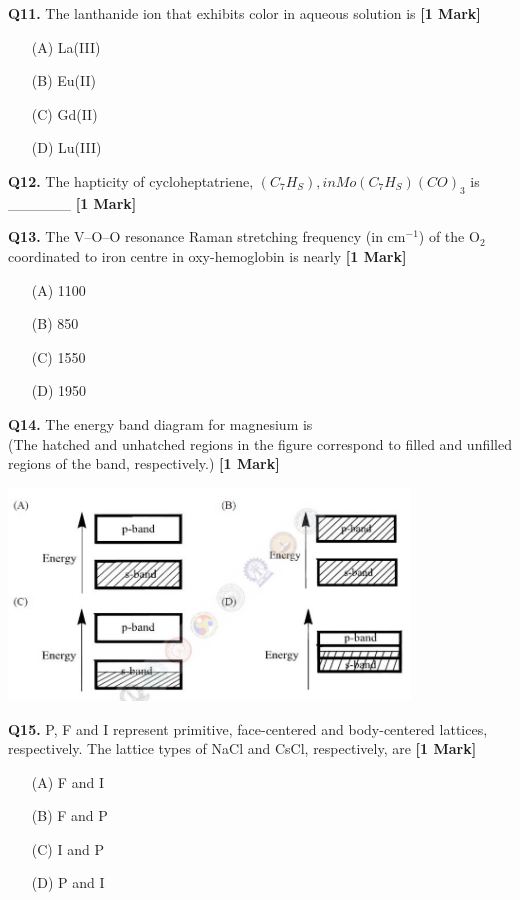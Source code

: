 \documentclass[11pt]{article}
\newcommand{\questiona}[2]{
    \noindent\textbf{Q#2.} #1 \hfill \textbf{[1 Mark]}
}
\begin{document}
\questiona{The lanthanide ion that exhibits color in aqueous solution is}{11}
\begin{enumerate}
    \item[(A)] La(III)
    \item[(B)] Eu(II)
    \item[(C)] Gd(II)
    \item[(D)] Lu(III)
\end{enumerate}
\vspace{0.5cm}

\questiona{The hapticity of cycloheptatriene, $(C_7H_S), in Mo(C_7H_S)(CO)_3$ is \_\_\_\_\_\_ }{12}
\vspace{0.5cm}

\questiona{The V–O–O resonance Raman stretching frequency (in cm\(^{-1}\)) of the O\(_2\) coordinated to iron centre in oxy-hemoglobin is nearly}{13}
\begin{enumerate}
    \item[(A)] 1100
    \item[(B)] 850
    \item[(C)] 1550
    \item[(D)] 1950
\end{enumerate}
\vspace{0.5cm}

\questiona{The energy band diagram for magnesium is \\ 
(The hatched and unhatched regions in the figure correspond to filled and unfilled regions of the band, respectively.)}{14}
\begin{center}
\includegraphics[width=0.8\textwidth]{figures/14.png}
\end{center}

\vspace{0.5cm}

\questiona{P, F and I represent primitive, face-centered and body-centered lattices, respectively. The lattice types of NaCl and CsCl, respectively, are}{15}
\begin{enumerate}
    \item[(A)] F and I
    \item[(B)] F and P
    \item[(C)] I and P
    \item[(D)] P and I
\end{enumerate}
\vspace{0.5cm}
\end{document}
